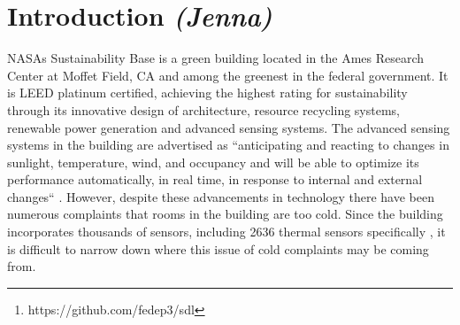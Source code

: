 \documentclass{acm_proc_article-sp}
\begin{document}

\maketitle
\begin{abstract}
The purpose of this research is to use machine learning methods to create an effective anomaly detection system, designed to predict real adverse thermal events in a smart building located on NASA's Sustainability Base. Our project centers around the design of an effective anomaly detection system modeled after ACCEPT, a state of the art system built by NASA engineers for comparing various regression models and detection methods. Our goal was to create a similarly performing system, but use open-source Python libraries as opposed to proprietary software based on MATLAB. Ultimately, we were able to create a highly effective system that could predict a cold event's occurrence using the given data with a 0.6\% False Positive rate and a 3.1\% Missed Detection rate. We compared our research results to those from another student team from Cornell, that used ACCEPT to predict cold events with the same data, and found that our system design results rivaled theirs. The source code for our research is publicly available online\footnote{https://github.com/fedep3/sdl}.
\end{abstract}

\section{Introduction \textit{(Jenna)}}
NASAs Sustainability Base \cite{nasasb} is a green building located in the Ames Research Center at Moffet Field, CA and among the greenest in the federal government. It is LEED platinum certified, achieving the highest rating for sustainability through its innovative design of architecture, resource recycling systems, renewable power generation and advanced sensing systems. The advanced sensing systems in the building are advertised as ``anticipating and reacting to changes in sunlight, temperature, wind, and occupancy and will be able to optimize its performance automatically, in real time, in response to internal and external changes`` \cite{nasasb}. However, despite these advancements in technology there have been numerous complaints that rooms in the building are too cold. Since the building incorporates thousands of sensors, including 2636 thermal sensors specifically \cite{Cornell}, it is difficult to narrow down where this issue of cold complaints may be coming from. 
\end{document}
